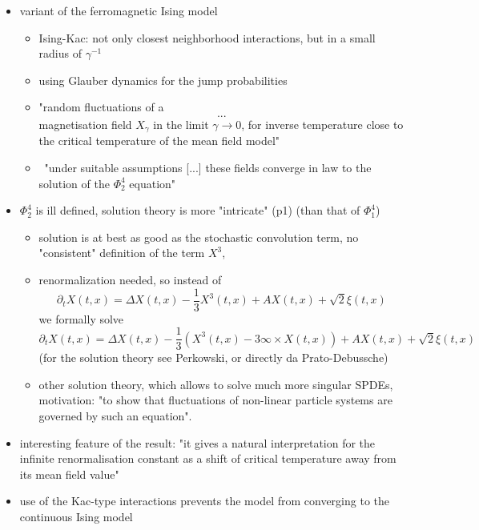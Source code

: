 \documentclass{report}
\theoremstyle{remark}
\theoremstyle{definition}
\begin{document}
\begin{itemize}
  \item variant of the ferromagnetic Ising model
  \begin{itemize}
    \item Ising-Kac: not only closest neighborhood interactions, but in a small radius of $\gamma^{-1}$
    \item using Glauber dynamics for the jump probabilities
    \item "random fluctuations of a \[...\] magnetisation field $X_\gamma$ in the limit $\gamma \to 0$, for inverse temperature close to the critical temperature of the mean field model" 
    \item ~"under suitable assumptions [...] these fields converge in law to the solution of the $\Phi^4_2$ equation"
  \end{itemize}
  \item $\Phi^4_2$ is ill defined, solution theory is more "intricate" (p1) (than that of $\Phi^4_1$)
  \begin{itemize}
    \item solution is at best as good as the stochastic convolution term, no "consistent" definition of the term $X^3$,
    \item renormalization needed, so instead of $$\partial_t X(t, x) = \Delta X(t, x) - \frac{1}{3} X^3(t, x) + A X(t, x) + \sqrt{2}\xi(t, x)$$we formally solve $$\partial_t X(t, x) = \Delta X(t, x) - \frac{1}{3} (X^3(t, x) - 3 \infty \times X(t, x))+ A X(t, x) + \sqrt{2}\xi(t, x)$$(for the solution theory see Perkowski, or directly da Prato-Debussche)
    \item other solution theory, which allows to solve much more singular SPDEs, motivation: "to show that fluctuations of non-linear particle systems are governed by such an equation". 
  \end{itemize}
  \item interesting feature of the result: "it gives a natural interpretation for the infinite renormalisation constant as a shift of critical temperature away from its mean field value"
  \item use of the Kac-type interactions prevents the model from converging to the continuous Ising model
\end{itemize}
\end{document}
